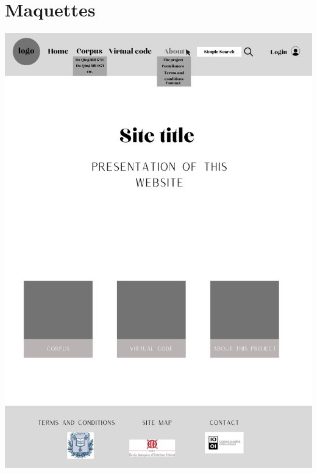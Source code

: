 \begin{landscape}
    
    
\end{landscape}

\newpage
\section*{Maquettes}
\noindent \includegraphics[width=\textwidth]{annexes/1 - Accueil.png}
